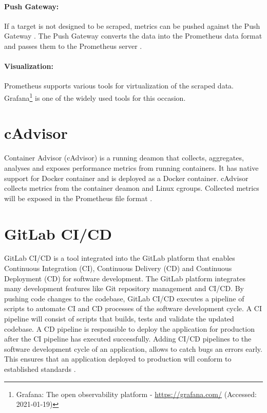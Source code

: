 \paragraph{Push Gateway:}
If a target is not designed to be scraped, metrics can be pushed against the Push Gateway \cite{Prom2020Docs}. The Push Gateway converts the data into the Prometheus data format and passes them to the Prometheus server \cite{Pandey2020Monitoring}.


\paragraph{Visualization:}
Prometheus supports various tools for virtualization of the scraped data. Grafana\footnote{Grafana: The open observability platform - \url{https://grafana.com/} (Accessed: 2021-01-19)} is one of the widely used tools for this occasion.


\section{cAdvisor}
Container Advisor (cAdvisor) is a running deamon that collects, aggregates, analyses and exposes performance metrics from running containers.
It has native support for Docker container and is deployed as a Docker container.
cAdvisor collects metrics from the container deamon and Linux cgroups.
Collected metrics will be exposed in the Prometheus file format \cite{Bastos2019Prom, cadvisor2020Docs}.


\section{GitLab CI/CD}
\label{sec:04_background_gitlab}
GitLab CI/CD is a tool integrated into the GitLab platform that enables Continuous Integration (CI), Continuous Delivery (CD) and Continuous Deployment (CD) for software development.
The GitLab platform integrates many development features like Git repository management and CI/CD.
By pushing code changes to the codebase, GitLab CI/CD executes a pipeline of scripts to automate CI and CD processes of the software development cycle.
A CI pipeline will consist of scripts that builds, tests and validate the updated codebase.
A CD pipeline is responsible to deploy the application for production after the CI pipeline has executed successfully.
Adding CI/CD pipelines to the software development cycle of an application, allows to catch bugs an errors early. This ensures that an application deployed to production will conform to established standards \cite{Gitlab2020Docs}.

